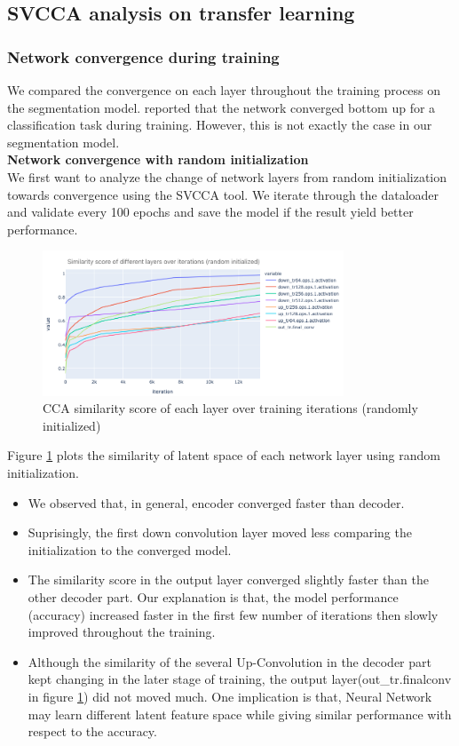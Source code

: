\subsection{SVCCA analysis on transfer learning}

\subsubsection{Network convergence during training}
We compared the convergence on each layer throughout the training process on the segmentation model. \cite{transfusion} reported that the network converged bottom up for a classification task during training. However, this is not exactly the case in our segmentation model.\\

\textbf{Network convergence with random initialization}\\

We first want to analyze the change of network layers from random initialization towards convergence using the SVCCA tool. We iterate through the dataloader and validate every 100 epochs and save the model if the result yield better performance.\\
\begin{figure}
	\centering
	\includegraphics[width=0.8\textwidth]{img/SVCCA/CCA_score_scratch.png}
	\caption{CCA similarity score of each layer over training iterations (randomly initialized)}
	\label{fig:random_init_converge}
\end{figure}

Figure \ref{fig:random_init_converge} plots the similarity of latent space of each network layer using random initialization. 
\begin{itemize}
	\item We observed that, in general, encoder converged faster than decoder.
	\item Suprisingly, the first down convolution layer moved less comparing the initialization to the converged model.
	\item The similarity score in the output layer converged slightly faster than the other decoder part. Our explanation is that, the model performance (accuracy) increased faster in the first few number of iterations then slowly improved throughout the training.
	\item Although the similarity of the several Up-Convolution in the decoder part kept changing in the later stage of training, the output layer(out\_tr.finalconv in figure \ref{fig:random_init_converge}) did not moved much. One implication is that, Neural Network may learn different latent feature space while giving similar performance with respect to the accuracy.
\end{itemize}

